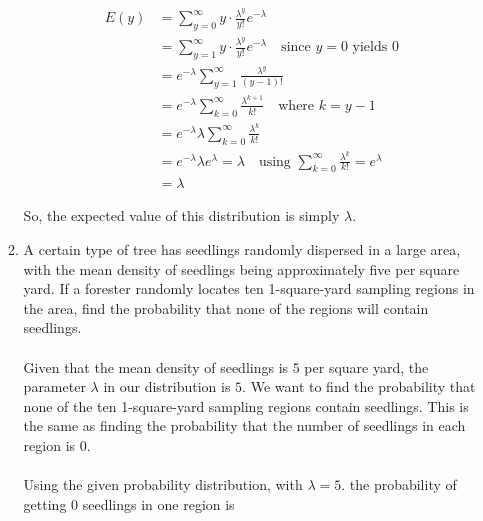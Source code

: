 \documentclass{article}
\begin{document}
\begin{enumerate}
\begin{enumerate}[label=3.\arabic*]
		            \begin{equation}
			            \begin{split}
				            E(y) & = \sum_{y=0}^{\infty} y \cdot \frac{\lambda^y}{y!}e^{-\lambda}                                                        \\
				                 & = \sum_{y=1}^{\infty} y \cdot \frac{\lambda^y}{y!}e^{-\lambda} \quad \text{since $y = 0$ yields 0}                    \\
				                 & = e^{-\lambda} \sum_{y=1}^{\infty}\frac{\lambda^y}{(y - 1)!}                                                          \\
				                 & = e^{-\lambda} \sum_{k=0}^{\infty}\frac{\lambda^{k+1}}{k!} \quad \text{where $k = y - 1$}                             \\
				                 & = e^{-\lambda} \lambda \sum_{k=0}^{\infty}\frac{\lambda^k}{k!}                                                        \\
				                 & = e^{-\lambda} \lambda e^{\lambda} = \lambda \quad \text{using $\sum_{k=0}^{\infty}\frac{\lambda^k}{k!} = e^\lambda$} \\
				                 & = \lambda
			            \end{split}
		            \end{equation}

		            So, the expected value of this distribution is simply $\lambda$.

		      \item A certain type of tree has seedlings randomly dispersed in a large area, with the mean density of seedlings being approximately five per square yard. If a forester randomly locates ten 1-square-yard sampling regions in the area, find the probability that none of the regions will contain seedlings.
		            \\~\\
		            Given that the mean density of seedlings is $5$ per square yard, the parameter $\lambda$ in our distribution is $5$. We want to find the probability that none of the ten 1-square-yard sampling regions contain seedlings. This is the same as finding the probability that the number of seedlings in each region is $0$.
		            \\~\\
		            Using the given probability distribution, with $\lambda = 5$. the probability of getting $0$ seedlings in one region is


\end{enumerate}
\end{enumerate}
\end{document}

